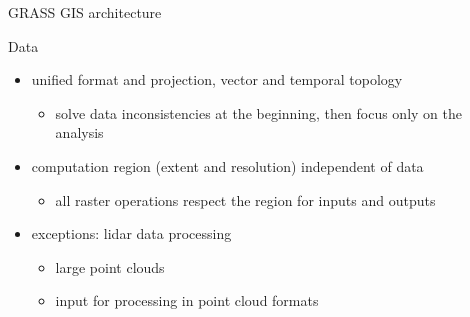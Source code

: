 \documentclass[xcolor={dvipsnames,usenames},beamer,aspectratio=169]{beamer}
\begin{document}



\begin{frame}{GRASS GIS architecture}

\begin{block}{Data}
 \begin{itemize}
  \item unified format and projection, vector and temporal topology
    \begin{itemize}
      \item solve data inconsistencies at the beginning, then focus only on the analysis
    \end{itemize}
  \item computation region (extent and resolution) independent of data
    \begin{itemize}
      \item all raster operations respect the region for inputs and outputs
    \end{itemize}
  \item exceptions: lidar data processing
    \begin{itemize}
      \item large point clouds
      \item input for processing in point cloud formats
    \end{itemize}
 \end{itemize}
\end{block}

\end{frame}
\end{document}

